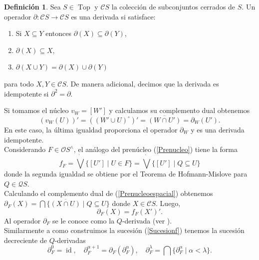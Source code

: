 \documentclass[11pt]{amsart}
\DeclareMathOperator{\id}{id}
\DeclareMathOperator{\Top}{Top}
\theoremstyle{plain}
\theoremstyle{definition}
\newtheorem{dfn}[thm]{Definición}
\begin{document}
\begin{dfn}\label{derivadaidempotente}
Sea $S\in \Top$ y $\mathcal{C}S$ la colección de subconjuntos cerrados de $S$. Un operador $\partial\colon \mathcal{C}S\to \mathcal{C}S$ es una derivada si satisface:
\begin{enumerate}
\item Si $X\subseteq Y$ entonces $\partial(X)\subseteq \partial(Y)$,
\item $\partial(X)\subseteq X$,
\item $\partial(X\cup Y)=\partial(X)\cup \partial(Y)$
\end{enumerate}
para todo $X,Y\in \mathcal{C}S$. De manera adicional, decimos que la derivada es idempotente si $\partial^2=\partial$.
\end{dfn}

Si tomamos el núcleo $v_W=[W']$ y calculamos su complemento dual obtenemos
\begin{equation}\label{eq:derivada}
(v_{W}(U))'=((W'\cup U)^{\circ})'=\overline{(W\cap U')}=\partial_{W}(U').
\end{equation}
En este caso, la última igualdad proporciona el operador $\partial_{W}$ y es una derivada idempotente.\\

Considerando $F\in \mathcal{O}S^\wedge$, el análogo del prenúcleo (\ref{Prenucleo}) tiene la forma
\begin{equation}\label{Prenucleoespacial}
f_F=\dot{\bigvee}\{[U']\mid U\in F\}=\dot{\bigvee}\{[U']\mid Q\subseteq U\}
\end{equation}
donde la segunda igualdad se obtiene por el Teorema de Hofmann-Mislove para $Q\in \mathcal{Q}S$.\\ 

Calculando el complemento dual de (\ref{Prenucleoespacial}) obtenemos $\partial_F(X)=\bigcap\{\overline{(X\cap U)}\mid Q\subseteq U\}$
donde $X\in \mathcal{C}S$. Luego, 
\begin{equation}\label{eq:complementodual}
\partial_F(X)=f_F(X')'.
\end{equation} 
Al operador $\partial_F$ se le conoce como la $Q$-derivada (ver \cite[Lema 6.1]{simmons2004vietoris}).\\

Similarmente a como construimos la sucesión (\ref{Sucesionf}) tenemos la sucesión decreciente de $Q$-derivadas
\[
\partial_F^0=\id, \quad \partial^{\alpha+1}_F=\partial_F(\partial_F^\alpha), \quad \partial_F^\lambda=\bigcap\{\partial_F^\alpha\mid \alpha<\lambda\}.
\]
\end{document}
